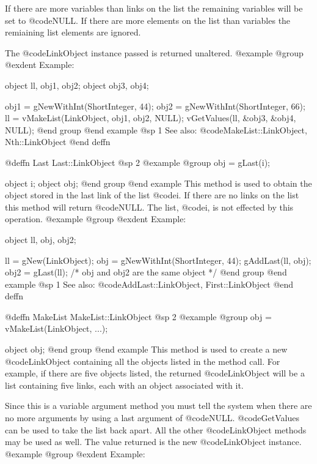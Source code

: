 If there are more variables than links on the list the remaining variables will be
set to @code{NULL}.  If there are more elements on the list than variables the
remiaining list elements are ignored.

The @code{LinkObject} instance passed is returned unaltered.
@example
@group
@exdent Example:

object  ll, obj1, obj2;
object  obj3, obj4;

obj1 = gNewWithInt(ShortInteger, 44);
obj2 = gNewWithInt(ShortInteger, 66);
ll = vMakeList(LinkObject, obj1, obj2, NULL);
vGetValues(ll, &obj3, &obj4, NULL);
@end group
@end example
@sp 1
See also:  @code{MakeList::LinkObject, Nth::LinkObject}
@end deffn











@deffn {Last} Last::LinkObject
@sp 2
@example
@group
obj = gLast(i);

object  i;
object  obj;
@end group
@end example
This method is used to obtain the object stored in the last link of the
list @code{i}.  If there are no links on the list this method will
return @code{NULL}.  The list, @code{i}, is not effected by this operation.
@example
@group
@exdent Example:

object  ll, obj, obj2;

ll = gNew(LinkObject);
obj = gNewWithInt(ShortInteger, 44);
gAddLast(ll, obj);
obj2 = gLast(ll);
/* obj and obj2 are the same object  */
@end group
@end example
@sp 1
See also:  @code{AddLast::LinkObject, First::LinkObject}
@end deffn











@deffn {MakeList} MakeList::LinkObject
@sp 2
@example
@group
obj = vMakeList(LinkObject, ...);

object  obj;
@end group
@end example
This method is used to create a new @code{LinkObject} containing all the
objects listed in the method call.  For example, if there are five objects listed, the
returned @code{LinkObject} will be a list containing five links, each with
an object associated with it.

Since this is a variable argument method you must tell the system when there are no
more arguments by using a last argument of @code{NULL}.  @code{GetValues} can be used to
take the list back apart.  All the other @code{LinkObject} methods may be
used as well.  The value returned is the new
@code{LinkObject} instance.
@example
@group
@exdent Example:

